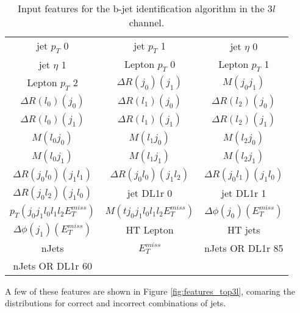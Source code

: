 \begin{table}[H]
  \begin{center}
  \begin{tabular}{ccc}
  \hline\hline
    jet  $p_T$ 0 & jet  $p_T$ 1 & jet  $\eta$ 0 \\
    jet  $\eta$ 1 & Lepton  $p_T$ 0 & Lepton  $p_T$ 1 \\
    Lepton  $p_T$ 2 & $\Delta R(j_0)(j_1)$ & $M(j_0j_1)$ \\
    $\Delta R(l_0)(j_0)$ & $\Delta R(l_1)(j_0)$ & $\Delta R(l_2)(j_0)$ \\
    $\Delta R(l_0)(j_1)$ & $\Delta R(l_1)(j_1)$ & $\Delta R(l_2)(j_1)$ \\
    $M(l_0j_0)$ & $M(l_1j_0)$ & $M(l_2j_0)$ \\
    $M(l_0j_1)$ & $M(l_1j_1)$ & $M(l_2j_1)$ \\
    $\Delta R(j_0l_0)(j_1l_1)$ & $\Delta R(j_0l_0)(j_1l_2)$ & $\Delta R(j_0l_1)(j_1l_0)$ \\
    $\Delta R(j_0l_2)(j_1l_0)$ & jet DL1r 0 & jet DL1r 1 \\
     $p_T(j_0j_1l_0l_1l_2E_T^{miss})$ & $M(tj_0j_1l_0l_1l_2E_T^{miss})$ & $\Delta\phi(j_0)(E_T^{miss})$ \\
    $\Delta\phi(j_1)(E_T^{miss})$ & HT Lepton & HT jets \\
    nJets & $E_T^{miss}$ & nJets OR DL1r 85 \\
    nJets OR DL1r 60 & & \\
    \hline
  \end{tabular}
  \end{center}
  \caption{Input features for the b-jet identification algorithm in the $3l$  channel.}
  \label{tab:top3lfeatures}
\end{table}

A few of these features are shown in Figure \ref{fig:features_top3l}, comaring the distributions for correct and incorrect combinations of jets.

